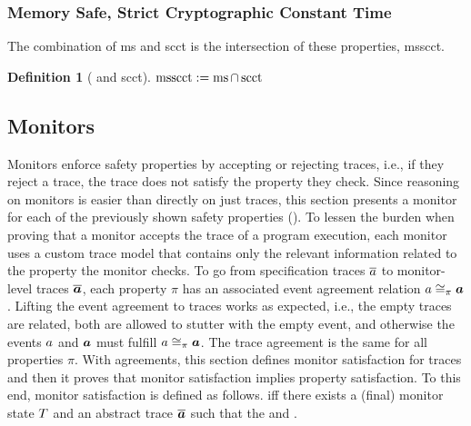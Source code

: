 \documentclass[dvipsnames,conference]{IEEEtran}
\theoremstyle{definition}
\newtheorem{definition}{Definition}[section]
\begin{document}
\subsubsection{Memory Safe, Strict Cryptographic Constant Time}

The combination of \gls*{ms} and \gls*{scct} is the intersection of these properties, \gls*{msscct}.

\begin{definition}[ and \gls*{scct}]\label{def:trace:msscctdef}
  $
  \msscctsafe:=\mssafe\cap\scctsafe
  $
\end{definition}

\subsection{Monitors}\label{subsec:monitors}

Monitors enforce safety properties by accepting or rejecting traces, i.e., if they reject a trace, the trace does not satisfy the property they check.
Since reasoning on monitors is easier than directly on just traces, this section presents a monitor for each of the previously shown safety properties ().
To lessen the burden when proving that a monitor accepts the trace of a program execution, each monitor uses a custom trace model that contains only the relevant information related to the property the monitor checks.
To go from specification traces $\trace$ to monitor-level traces $\abstrace$, each property $\pi$ has an associated event agreement relation $\traceagree[]{\pi}{\event}{\absevent}$.
Lifting the event agreement to traces works as expected, i.e., the empty traces are related, both are allowed to stutter with the empty event, and otherwise the events $\event$ and $\absevent$ must fulfill $\traceagree[]{\pi}{\event}{\absevent}$.
The trace agreement is the same for all properties $\pi$. 
With agreements, this section defines monitor satisfaction for traces and then it proves that monitor satisfaction implies property satisfaction.
To this end, monitor satisfaction is defined as follows.
 iff there exists a (final) monitor state $\monitor$ and an abstract trace $\abstrace$ such that the  and .
\end{document}

